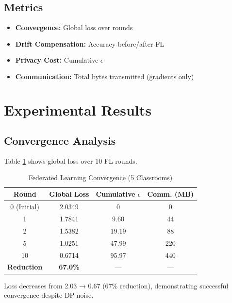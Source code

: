 \documentclass[conference]{IEEEtran}
\begin{document}
\subsection{Metrics}

\begin{itemize}
    \item \textbf{Convergence:} Global loss over rounds
    \item \textbf{Drift Compensation:} Accuracy before/after FL
    \item \textbf{Privacy Cost:} Cumulative $\epsilon$
    \item \textbf{Communication:} Total bytes transmitted (gradients only)
\end{itemize}

\section{Experimental Results}

\subsection{Convergence Analysis}

Table \ref{tab:convergence} shows global loss over 10 FL rounds.

\begin{table}[h]
\caption{Federated Learning Convergence (5 Classrooms)}
\begin{center}
\begin{tabular}{cccc}
\toprule
\textbf{Round} & \textbf{Global Loss} & \textbf{Cumulative $\epsilon$} & \textbf{Comm. (MB)} \\
\midrule
0 (Initial) & 2.0349 & 0 & 0 \\
1 & 1.7841 & 9.60 & 44 \\
2 & 1.5382 & 19.19 & 88 \\
5 & 1.0251 & 47.99 & 220 \\
10 & 0.6714 & 95.97 & 440 \\
\bottomrule
\textbf{Reduction} & \textbf{67.0\%} & — & — \\
\end{tabular}
\end{center}
\label{tab:convergence}
\end{table}

Loss decreases from 2.03 → 0.67 (67\% reduction), demonstrating successful convergence despite DP noise.
\end{document}
